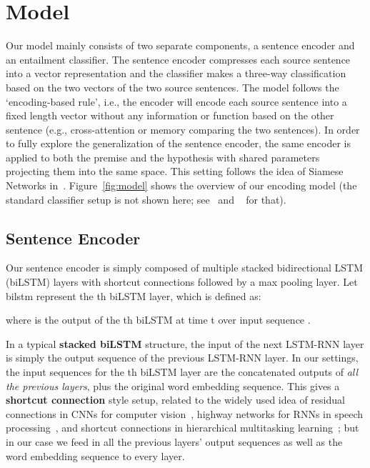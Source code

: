 \documentclass[11pt,letterpaper]{article}
\begin{document}
\section{Model}
Our model mainly consists of two separate components, a sentence encoder and an entailment classifier. The sentence encoder compresses each source sentence into a vector representation and the classifier makes a three-way classification based on the two vectors of the two source sentences. The model follows the `encoding-based rule', i.e., the encoder will encode each source sentence into a fixed length vector without any information or function based on the other sentence (e.g., cross-attention or memory comparing the two sentences). In order to fully explore the generalization of the sentence encoder, the same encoder is applied to both the premise and the hypothesis with shared parameters projecting them into the same space. This setting follows the idea of Siamese Networks in~. Figure~\ref{fig:model} shows the overview of our encoding model (the standard classifier setup is not shown here; see~ and ~ for that).



\subsection{Sentence Encoder}
Our sentence encoder is simply composed of multiple stacked bidirectional LSTM (biLSTM) layers with shortcut connections followed by a max pooling layer.
Let bilstm represent the th biLSTM layer, which is defined as:

where  is the output of the th biLSTM at time t over input sequence .

In a typical \textbf{stacked biLSTM} structure, the input of the next LSTM-RNN layer is simply the output sequence of the previous LSTM-RNN layer. In our settings, the input sequences for the th biLSTM layer are the concatenated outputs of \emph{all the previous layers}, plus the original word embedding sequence. This gives a \textbf{shortcut connection} style setup, related to the widely used idea of residual connections in CNNs for computer vision~\cite{he2016deep}, highway networks for RNNs in speech processing~\cite{zhang2016highway}, and shortcut connections in hierarchical multitasking learning~\cite{hashimoto2016joint}; but in our case we feed in all the previous layers' output sequences as well as the word embedding sequence to every layer.
\end{document}
